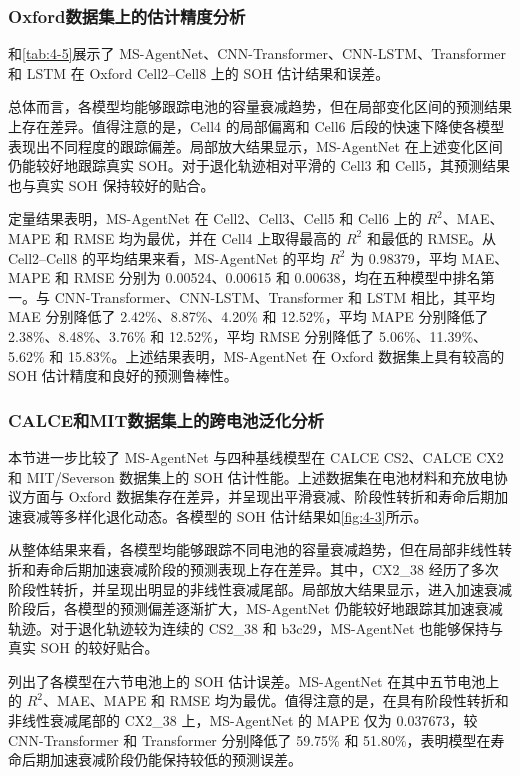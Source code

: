 \subsubsection{Oxford数据集上的估计精度分析}

和\cref{tab:4-5}展示了 MS-AgentNet、CNN-Transformer、CNN-LSTM、Transformer 和 LSTM 在 Oxford Cell2--Cell8 上的 SOH 估计结果和误差。



总体而言，各模型均能够跟踪电池的容量衰减趋势，但在局部变化区间的预测结果上存在差异。值得注意的是，Cell4 的局部偏离和 Cell6 后段的快速下降使各模型表现出不同程度的跟踪偏差。局部放大结果显示，MS-AgentNet 在上述变化区间仍能较好地跟踪真实 SOH。对于退化轨迹相对平滑的 Cell3 和 Cell5，其预测结果也与真实 SOH 保持较好的贴合。

定量结果表明，MS-AgentNet 在 Cell2、Cell3、Cell5 和 Cell6 上的 $R^2$、MAE、MAPE 和 RMSE 均为最优，并在 Cell4 上取得最高的 $R^2$ 和最低的 RMSE。从 Cell2--Cell8 的平均结果来看，MS-AgentNet 的平均 $R^2$ 为 0.98379，平均 MAE、MAPE 和 RMSE 分别为 0.00524、0.00615 和 0.00638，均在五种模型中排名第一。与 CNN-Transformer、CNN-LSTM、Transformer 和 LSTM 相比，其平均 MAE 分别降低了 2.42\%、8.87\%、4.20\% 和 12.52\%，平均 MAPE 分别降低了 2.38\%、8.48\%、3.76\% 和 12.52\%，平均 RMSE 分别降低了 5.06\%、11.39\%、5.62\% 和 15.83\%。上述结果表明，MS-AgentNet 在 Oxford 数据集上具有较高的 SOH 估计精度和良好的预测鲁棒性。


\FloatBarrier

\subsubsection{CALCE和MIT数据集上的跨电池泛化分析}

本节进一步比较了 MS-AgentNet 与四种基线模型在 CALCE CS2、CALCE CX2 和 MIT/Severson 数据集上的 SOH 估计性能。上述数据集在电池材料和充放电协议方面与 Oxford 数据集存在差异，并呈现出平滑衰减、阶段性转折和寿命后期加速衰减等多样化退化动态。各模型的 SOH 估计结果如\cref{fig:4-3}所示。

从整体结果来看，各模型均能够跟踪不同电池的容量衰减趋势，但在局部非线性转折和寿命后期加速衰减阶段的预测表现上存在差异。其中，CX2\_38 经历了多次阶段性转折，并呈现出明显的非线性衰减尾部。局部放大结果显示，进入加速衰减阶段后，各模型的预测偏差逐渐扩大，MS-AgentNet 仍能较好地跟踪其加速衰减轨迹。对于退化轨迹较为连续的 CS2\_38 和 b3c29，MS-AgentNet 也能够保持与真实 SOH 的较好贴合。

列出了各模型在六节电池上的 SOH 估计误差。MS-AgentNet 在其中五节电池上的 $R^2$、MAE、MAPE 和 RMSE 均为最优。值得注意的是，在具有阶段性转折和非线性衰减尾部的 CX2\_38 上，MS-AgentNet 的 MAPE 仅为 0.037673，较 CNN-Transformer 和 Transformer 分别降低了 59.75\% 和 51.80\%，表明模型在寿命后期加速衰减阶段仍能保持较低的预测误差。

